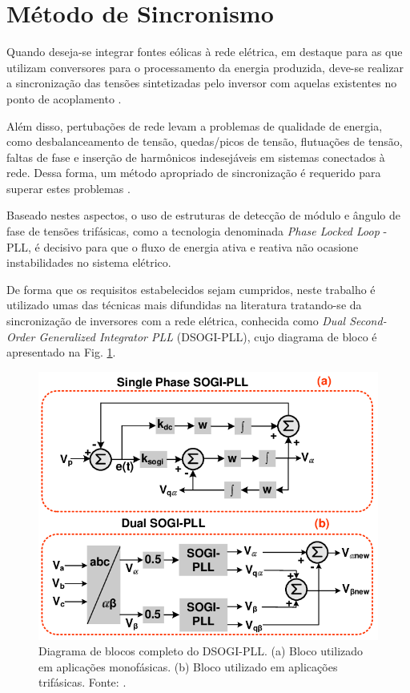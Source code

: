 \section{Método de Sincronismo}

Quando deseja-se integrar fontes eólicas à rede elétrica, em destaque para as que utilizam conversores 
para o processamento da energia produzida, deve-se realizar a sincronização das tensões sintetizadas 
pelo inversor com aquelas existentes no ponto de acoplamento \cite{TeseProfAlex}. 

Além disso, pertubações de rede levam a problemas de qualidade de energia, como desbalanceamento 
de tensão, quedas/picos de tensão, flutuações de tensão, faltas de fase e inserção de harmônicos 
indesejáveis em sistemas conectados à rede. Dessa forma, um método apropriado de sincronização é 
requerido para superar estes problemas \cite{Meral2018}. 

Baseado nestes aspectos, o uso de estruturas de detecção de módulo e ângulo de fase de tensões 
trifásicas, como a tecnologia denominada \textit{Phase Locked Loop} - PLL, é decisivo para que o 
fluxo de energia ativa e reativa não ocasione instabilidades no sistema elétrico.

De forma que os requisitos estabelecidos sejam cumpridos, neste trabalho é utilizado umas 
das técnicas mais difundidas na literatura tratando-se da sincronização de inversores com a rede 
elétrica, conhecida como \textit{Dual Second-Order Generalized Integrator PLL} (DSOGI-PLL), 
cujo diagrama de bloco é apresentado na Fig. \ref{fig:DSOGI_PLL}.  

\begin{figure}[!hbt]
	\begin{center}
		\includegraphics[width=0.6\columnwidth]{figuras/DSOGI_PLL.PNG}
		\caption{Diagrama de blocos completo do DSOGI-PLL. (a) Bloco utilizado em aplicações monofásicas. (b) Bloco utilizado em aplicações trifásicas. Fonte: \cite{Meral2018}.}
		\label{fig:DSOGI_PLL}
	\end{center}
\end{figure}

